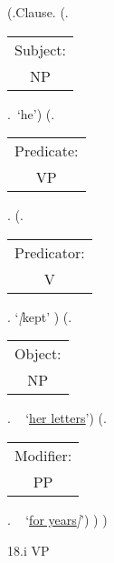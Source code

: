 \documentclass[12pt,letterpaper]{article}
\begin{document}
\begin{figure}
	\begin{center}
		\begin{parsetree}
			(.Clause.
			(.\begin{tabular}{c}Subject:\\NP\end{tabular}.~`he')
			(.\begin{tabular}{c}Predicate:\\VP\end{tabular}.
			(.\begin{tabular}{c}Predicator:\\V\end{tabular}. `\emph{[}kept' )
			(.\begin{tabular}{c}Object:\\NP\end{tabular}.  ~ `\underline{\underline{her letters}}')
			(.\begin{tabular}{c}Modifier:\\PP\end{tabular}.  ~ `\underline{for years}\emph{]}')
			)
			)
			
			\hfill \break\hfill \break
		\end{parsetree}
		18.i VP
	\end{center}
\end{figure}
\end{document}
